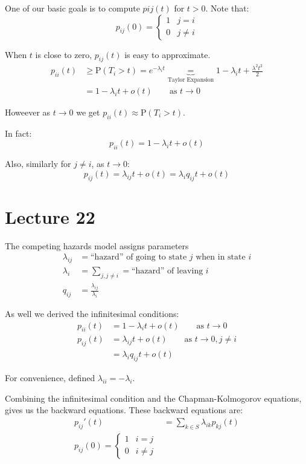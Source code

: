 \documentclass[english,12pt]{article}
\theoremstyle{plain}
\theoremstyle{definition}
\theoremstyle{definition} %
\begin{document}
One of our basic goals is to compute $p{ij}(t)$ for $t>0$.  Note that:
\[p_{ij}(0)=\begin{cases}1 & j=i\\ 0 & j\ne i\end{cases}\]

When $t$ is close to zero, $p_{ij}(t)$ is easy to approximate.
\begin{align*}
p_{ii}(t)&\ge\text{P}(T_i>t)
=e^{-\lambda_i t}
\underbrace{=}_{\text{Taylor Expansion}}1-\lambda_i t+\frac{\lambda^2 t^2}{2}\\
&=1-\lambda_it+o(t)\qquad \text{as }t\to 0
\end{align*}

Howeever as $t\to 0$ we get $p_{ii}(t)\approx \text{P}(T_i>t)$.

In fact:
\[p_{ii}(t)=1-\lambda_it +o(t)\]

Also, similarly for $j\ne i$, as $t\to 0$:
\[p_{ij}(t)=\lambda_{ij}t+o(t)=\lambda_iq_{ij}t+o(t)\]

\section*{Lecture 22}
The competing hazards model assigns parameters
\begin{align*}
\lambda_{ij}&=\text{``hazard'' of going to state }j\text{ when in state }i\\
\lambda_i&=\sum_{j,j\ne i}=\text{``hazard'' of leaving }i\\
q_{ij}&=\frac{\lambda_{ij}}{\lambda_i}
\end{align*}

As well we derived the infinitesimal conditions:
\begin{align*}
p_{ii}(t)&=1-\lambda_it+o(t)\qquad \text{as }t\to 0\\
p_{ij}(t)&=\lambda_{ij}t+o(t)\qquad \text{as }t\to 0, j\ne i\\
&=\lambda_i q_{ij}t+o(t)
\end{align*}

For convenience, defined $\lambda_{ii}=-\lambda_i$.

Combining the infinitesimal condition and the Chapman-Kolmogorov equations, gives us the backward equations.  These backward equations are:
\begin{align*}
p_{ij}'(t)&=\sum_{k\in S}\lambda_{ik}p_{kj}(t)\\
p_{ij}(0)=\begin{cases}1 & i=j\\ 0& i\ne j\end{cases}
\end{align*}
\end{document}
